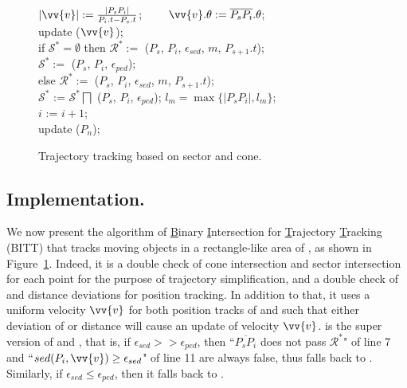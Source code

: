 \begin{figure}[tb!]
\begin{center}
{\begin{minipage}{3.3in}
{					\icc \>\hspace{7ex}    $|\vv{v}|:=\frac{|P_sP_{i}|}{P_{i}.t-P_s.t}$; ~~~~$\vv{v}.\theta:=\overline{P_sP_{i}}.\theta$; \\
					\icc \>\hspace{7ex}    update ($\vv{v}$); \\
					\icc \>\hspace{3ex} if $\mathcal{S}^*=\emptyset$ then $\mathcal{R}^*:=$ ($P_s$, $P_{i}$, $\epsilon_{sed}$, $m$, $P_{s+1}.t$); \\
					\icc \>\hspace{7ex}    $\mathcal{S}^*:=$ ($P_s$, $P_{i}$, $\epsilon_{ped}$); \\
					\icc \>\hspace{3ex} else $\mathcal{R}^*:=$ ($P_s$, $P_{i}$, $\epsilon_{sed}$, $m$, $P_{s+1}.t$); \\
					\icc \>\hspace{7ex}    $\mathcal{S}^*$ := $\mathcal{S}^*\bigsqcap$ ($P_s$, $P_{i}$, $\epsilon_{ped}$); $l_{m} = \max\{|P_sP_{i}|, l_{m}\}$;\\
					\icc \>\hspace{3ex} $i$ := $i +1$;\\
					\icc \>\hspace{0ex} update ($P_{n}$); 
				}
				\vspace{-2ex}
				\myhrule
			\end{minipage}
		}
	\end{center}
	\vspace{-2ex}
	\caption{\small Trajectory tracking based on sector and cone.}
	\label{alg:bitt}
	\vspace{-2ex}
\end{figure}

\subsection{Implementation.}
We now present the algorithm of \underline{B}inary \underline{I}ntersection for \underline{T}rajectory \underline{T}racking (BITT) that tracks moving objects in a rectangle-like area of \bed, as shown in Figure~\ref{alg:bitt}. 
%
Indeed, it is a double check of cone intersection and sector intersection for each point for the purpose of trajectory simplification, and a double check of \sed and \ped distance deviations for position tracking. In addition to that, it uses a uniform velocity $\vv{v}$ for both position tracks of \sed and \ped such that either deviation of \ped or \sed distance will cause an update of velocity $\vv{v}$. 
%
\bitt is the super version of \citt and \sitt, that is, if $\epsilon_{sed} >> \epsilon_{ped}$, then ``$\overline{P_sP_{i}}$ does not pass $\mathcal{R}^*$" of line 7 and ``$sed(P_i, \vv{v}) \ge \epsilon_{sed}$" of line 11 are always false, thus \bitt falls back to \sitt. {Similarly, if $\epsilon_{sed} \le \epsilon_{ped}$, then it falls back to \citt.}




